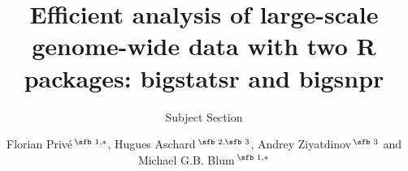 \documentclass{bioinfo}
\begin{document}

\subtitle{Subject Section}

\title[R packages for analyzing genome-wide data]{Efficient analysis of large-scale genome-wide data with two R packages: bigstatsr and bigsnpr}
\author[Sample \textit{et~al}.]{Florian Priv\'e\,$^{\text{\sfb 1,}*}$, Hugues Aschard\,$^{\text{\sfb 2,\sfb 3}}$, Andrey Ziyatdinov\,$^{\text{\sfb 3}}$ and Michael G.B. Blum\,$^{\text{\sfb 1,}*}$}
\address{$^{\text{\sf 1}}$Universit\'e Grenoble Alpes, CNRS, Laboratoire TIMC-IMAG, UMR 5525, France, \\
$^{\text{\sf 2}}$Centre de Bioinformatique, Biostatistique et Biologie Int\'egrative (C3BI), Institut Pasteur, Paris, France, \\
$^{\text{\sf 3}}$Department of Epidemiology, Harvard T.H. Chan School of Public Health, Boston, Massachusetts, USA.}



\end{document}
